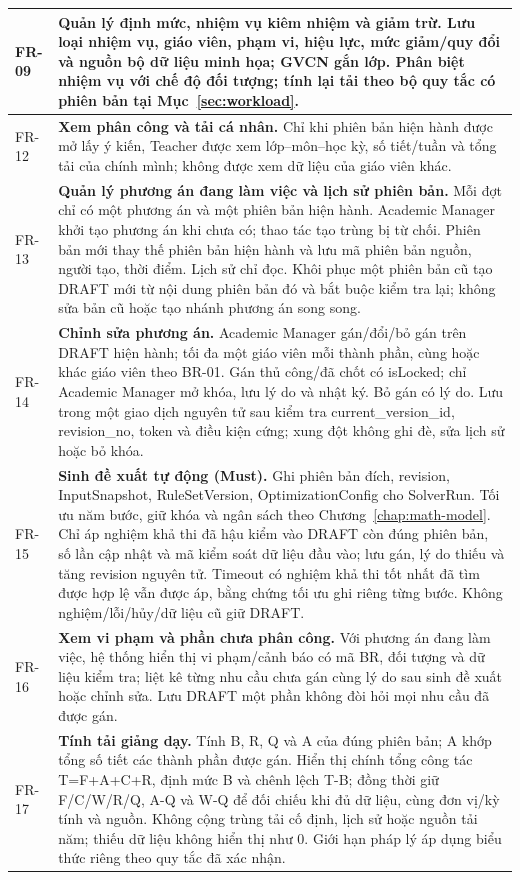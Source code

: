 \documentclass[12pt,a4paper]{report}
\begin{document}
\begin{longtable}{|p{1.45cm}|p{12.5cm}|}
FR-09 & \textbf{Quản lý định mức, nhiệm vụ kiêm nhiệm và giảm trừ.} Lưu loại nhiệm vụ, giáo viên, phạm vi, hiệu lực, mức giảm/quy đổi và nguồn bộ dữ liệu minh họa; GVCN gắn lớp. Phân biệt nhiệm vụ với chế độ đối tượng; tính lại tải theo bộ quy tắc có phiên bản tại Mục~\ref{sec:workload}. \\\hline
FR-12 & \textbf{Xem phân công và tải cá nhân.} Chỉ khi phiên bản hiện hành được mở lấy ý kiến, Teacher được xem lớp--môn--học kỳ, số tiết/tuần và tổng tải của chính mình; không được xem dữ liệu của giáo viên khác. \\\hline
FR-13 & \textbf{Quản lý phương án đang làm việc và lịch sử phiên bản.} Mỗi đợt chỉ có một phương án và một phiên bản hiện hành. Academic Manager khởi tạo phương án khi chưa có; thao tác tạo trùng bị từ chối. Phiên bản mới thay thế phiên bản hiện hành và lưu mã phiên bản nguồn, người tạo, thời điểm. Lịch sử chỉ đọc. Khôi phục một phiên bản cũ tạo DRAFT mới từ nội dung phiên bản đó và bắt buộc kiểm tra lại; không sửa bản cũ hoặc tạo nhánh phương án song song. \\\hline
FR-14 & \textbf{Chỉnh sửa phương án.} Academic Manager gán/đổi/bỏ gán trên DRAFT hiện hành; tối đa một giáo viên mỗi thành phần, cùng hoặc khác giáo viên theo BR-01. Gán thủ công/đã chốt có isLocked; chỉ Academic Manager mở khóa, lưu lý do và nhật ký. Bỏ gán có lý do. Lưu trong một giao dịch nguyên tử sau kiểm tra current\_version\_id, revision\_no, token và điều kiện cứng; xung đột không ghi đè, sửa lịch sử hoặc bỏ khóa. \\\hline
FR-15 & \textbf{Sinh đề xuất tự động (Must).} Ghi phiên bản đích, revision, InputSnapshot, RuleSetVersion, OptimizationConfig cho SolverRun. Tối ưu năm bước, giữ khóa và ngân sách theo Chương~\ref{chap:math-model}. Chỉ áp nghiệm khả thi đã hậu kiểm vào DRAFT còn đúng phiên bản, số lần cập nhật và mã kiểm soát dữ liệu đầu vào; lưu gán, lý do thiếu và tăng revision nguyên tử. Timeout có nghiệm khả thi tốt nhất đã tìm được hợp lệ vẫn được áp, bằng chứng tối ưu ghi riêng từng bước. Không nghiệm/lỗi/hủy/dữ liệu cũ giữ DRAFT. \\\hline
FR-16 & \textbf{Xem vi phạm và phần chưa phân công.} Với phương án đang làm việc, hệ thống hiển thị vi phạm/cảnh báo có mã BR, đối tượng và dữ liệu kiểm tra; liệt kê từng nhu cầu chưa gán cùng lý do sau sinh đề xuất hoặc chỉnh sửa. Lưu DRAFT một phần không đòi hỏi mọi nhu cầu đã được gán. \\\hline
FR-17 & \textbf{Tính tải giảng dạy.} Tính B, R, Q và A của đúng phiên bản; A khớp tổng số tiết các thành phần được gán. Hiển thị chính tổng công tác T=F+A+C+R, định mức B và chênh lệch T-B; đồng thời giữ F/C/W/R/Q, A-Q và W-Q để đối chiếu khi đủ dữ liệu, cùng đơn vị/kỳ tính và nguồn. Không cộng trùng tải cố định, lịch sử hoặc nguồn tải năm; thiếu dữ liệu không hiển thị như 0. Giới hạn pháp lý áp dụng biểu thức riêng theo quy tắc đã xác nhận. \\\hline

\end{longtable}
\end{document}

